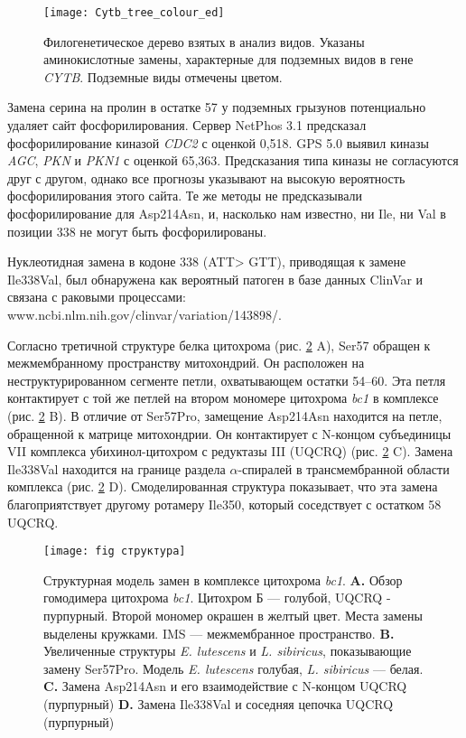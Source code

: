 \begin{figure}[h!]
	\begin{center}
		\texttt{[image: Cytb\_tree\_colour\_ed]}
	\end{center}
	\caption{Филогенетическое дерево взятых в анализ видов. Указаны аминокислотные замены, характерные для подземных видов в гене \textit{CYTB}. Подземные виды отмечены цветом.}
	\label{PhyloTree}
\end{figure}

Замена серина на пролин в остатке 57 у подземных грызунов потенциально удаляет сайт фосфорилирования. Сервер NetPhos 3.1 предсказал фосфорилирование киназой \textit{CDC2} с оценкой 0,518. GPS 5.0 выявил киназы \textit{AGC}, \textit{PKN} и \textit{PKN1} с оценкой 65,363. Предсказания типа киназы не согласуются друг с другом, однако все прогнозы указывают на высокую вероятность фосфорилирования этого сайта. Те же методы не предсказывали фосфорилирование для Asp214Asn, и, насколько нам известно, ни Ile, ни Val в позиции 338 не могут быть фосфорилированы.

Нуклеотидная замена в кодоне 338 (ATT> GTT), приводящая к замене Ile338Val, был обнаружена как вероятный патоген в базе данных ClinVar и связана с раковыми процессами: www.ncbi.nlm.nih.gov/clinvar/variation/143898/.

Согласно третичной структуре белка цитохрома (рис. \ref{CytStructure} A), Ser57 обращен к межмембранному пространству митохондрий. Он расположен на неструктурированном сегменте петли, охватывающем остатки 54–60. Эта петля контактирует с той же петлей на втором мономере цитохрома \textit{bc1} в комплексе (рис. \ref{CytStructure} B). В отличие от Ser57Pro, замещение Asp214Asn находится на петле, обращенной к матрице митохондрии. Он контактирует с N-концом субъединицы VII комплекса убихинол-цитохром с редуктазы III (UQCRQ) (рис. \ref{CytStructure} C). Замена Ile338Val находится на границе раздела $\alpha$-спиралей в трансмембранной области комплекса (рис. \ref{CytStructure} D). Смоделированная структура показывает, что эта замена благоприятствует другому ротамеру Ile350, который соседствует с остатком 58 UQCRQ.

\begin{figure}[h!]
	\begin{center}
		\texttt{[image: fig структура]}
	\end{center}
	\caption{Структурная модель замен в комплексе цитохрома \textit{bc1}. \textbf{A.} Обзор гомодимера цитохрома \textit{bc1}. Цитохром Б --- голубой, UQCRQ - пурпурный. Второй мономер окрашен в желтый цвет. Места замены выделены кружками. IMS --- межмембранное пространство. \textbf{B.} Увеличенные структуры \textit{E. lutescens} и \textit{L. sibiricus}, показывающие замену Ser57Pro. Модель \textit{E. lutescens} голубая, \textit{L. sibiricus} --- белая. \textbf{C.} Замена Asp214Asn и его взаимодействие с N-концом UQCRQ (пурпурный) \textbf{D.} Замена Ile338Val и соседняя цепочка UQCRQ (пурпурный)}
	\label{CytStructure}
\end{figure}

